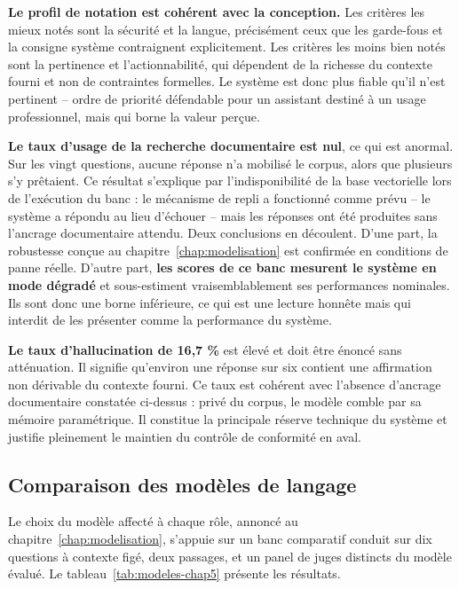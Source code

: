 \textbf{Le profil de notation est cohérent avec la conception.} Les critères les mieux notés sont la sécurité et la langue, précisément ceux que les garde-fous et la consigne système contraignent explicitement. Les critères les moins bien notés sont la pertinence et l'actionnabilité, qui dépendent de la richesse du contexte fourni et non de contraintes formelles. Le système est donc plus fiable qu'il n'est pertinent -- ordre de priorité défendable pour un assistant destiné à un usage professionnel, mais qui borne la valeur perçue.

\textbf{Le taux d'usage de la recherche documentaire est nul}, ce qui est anormal. Sur les vingt questions, aucune réponse n'a mobilisé le corpus, alors que plusieurs s'y prêtaient. Ce résultat s'explique par l'indisponibilité de la base vectorielle lors de l'exécution du banc : le mécanisme de repli a fonctionné comme prévu -- le système a répondu au lieu d'échouer -- mais les réponses ont été produites sans l'ancrage documentaire attendu. Deux conclusions en découlent. D'une part, la robustesse conçue au chapitre~\ref{chap:modelisation} est confirmée en conditions de panne réelle. D'autre part, \textbf{les scores de ce banc mesurent le système en mode dégradé} et sous-estiment vraisemblablement ses performances nominales. Ils sont donc une borne inférieure, ce qui est une lecture honnête mais qui interdit de les présenter comme la performance du système.

\textbf{Le taux d'hallucination de 16,7 \%} est élevé et doit être énoncé sans atténuation. Il signifie qu'environ une réponse sur six contient une affirmation non dérivable du contexte fourni. Ce taux est cohérent avec l'absence d'ancrage documentaire constatée ci-dessus : privé du corpus, le modèle comble par sa mémoire paramétrique. Il constitue la principale réserve technique du système et justifie pleinement le maintien du contrôle de conformité en aval.

\subsection{Comparaison des modèles de langage}

Le choix du modèle affecté à chaque rôle, annoncé au chapitre~\ref{chap:modelisation}, s'appuie sur un banc comparatif conduit sur dix questions à contexte figé, deux passages, et un panel de juges distincts du modèle évalué. Le tableau~\ref{tab:modeles-chap5} présente les résultats.

\begingroup
\setlength{\tabcolsep}{3pt}
\renewcommand{\arraystretch}{1.15}
\small

